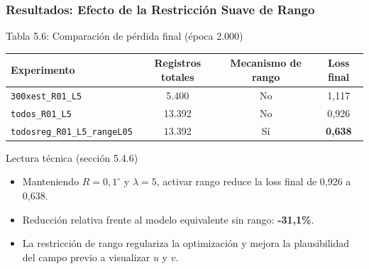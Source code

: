 \begin{frame}[fragile]
  \frametitle{Resultados: Efecto de la Restricción Suave de Rango}

  \begin{block}{Tabla 5.6: Comparación de pérdida final (época 2.000)}
    \scriptsize
    \centering
    \begin{tabular}{lccc}
      \hline
      Experimento & Registros totales & Mecanismo de rango & Loss final \\
      \hline
      \texttt{300xest\_R01\_L5} & 5.400 & No & 1,117 \\
      \texttt{todos\_R01\_L5} & 13.392 & No & 0,926 \\
      \texttt{todosreg\_R01\_L5\_rangeL05} & 13.392 & Sí & \textbf{0,638} \\
      \hline
    \end{tabular}
  \end{block}

  \begin{block}{Lectura técnica (sección 5.4.6)}
    \begin{itemize}
      \small
      \item Manteniendo $R=0{,}1^\circ$ y $\lambda=5$, activar rango reduce la loss final de 0,926 a 0,638.
      \item Reducción relativa frente al modelo equivalente sin rango: \textbf{-31,1\%}.
      \item La restricción de rango regulariza la optimización y mejora la plausibilidad del campo previo a visualizar $u$ y $v$.
    \end{itemize}
  \end{block}

\end{frame}

